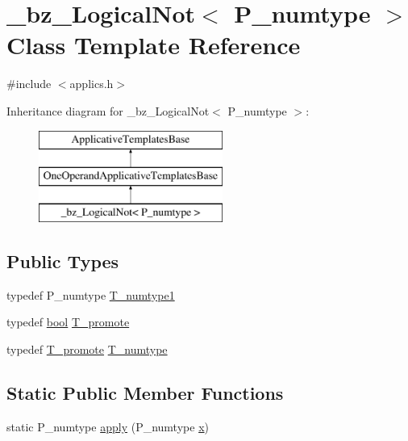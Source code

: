 \hypertarget{class__bz__LogicalNot}{}\section{\+\_\+bz\+\_\+\+Logical\+Not$<$ P\+\_\+numtype $>$ Class Template Reference}
\label{class__bz__LogicalNot}


{\ttfamily \#include $<$applics.\+h$>$}

Inheritance diagram for \+\_\+bz\+\_\+\+Logical\+Not$<$ P\+\_\+numtype $>$\+:\begin{figure}[H]
\begin{center}
\leavevmode
\includegraphics[height=3.000000cm]{class__bz__LogicalNot}
\end{center}
\end{figure}
\subsection*{Public Types}
\begin{DoxyCompactItemize}
\item 
typedef P\+\_\+numtype \hyperlink{class__bz__LogicalNot_aaf341c21676543e595e5835b96b8f621}{T\+\_\+numtype1}
\item 
typedef \hyperlink{compiler_8h_abb452686968e48b67397da5f97445f5b}{bool} \hyperlink{class__bz__LogicalNot_aed00b59116abe21507d86e0365617d07}{T\+\_\+promote}
\item 
typedef \hyperlink{class__bz__LogicalNot_aed00b59116abe21507d86e0365617d07}{T\+\_\+promote} \hyperlink{class__bz__LogicalNot_a070a333bdbec474e448ffb76bdc06a4a}{T\+\_\+numtype}
\end{DoxyCompactItemize}
\subsection*{Static Public Member Functions}
\begin{DoxyCompactItemize}
\item 
static P\+\_\+numtype \hyperlink{class__bz__LogicalNot_a95278d5adb71972a713e3147e702d67d}{apply} (P\+\_\+numtype \hyperlink{vecnorm1_8cc_ac73eed9e41ec09d58f112f06c2d6cb63}{x})
\end{DoxyCompactItemize}


